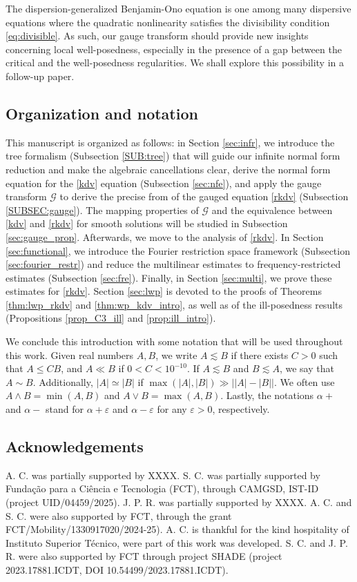 \documentclass[%
11pt,  reqno]{amsart}
\newcommand{\5}{\textup{V}}
\newcommand{\les}{\lesssim}
\newcommand{\eps}{\varepsilon}
\theoremstyle{remark}
\newcommand{\al}{\alpha}
\newcommand{\Gc}{\mathcal{G}}
\numberwithin{equation}{section}
\numberwithin{theorem}{section}
\begin{document}
\bigskip

The dispersion-generalized Benjamin-Ono equation is one among many dispersive equations where the quadratic nonlinearity satisfies the divisibility condition \eqref{eq:divisible}. As such, our gauge transform should provide new insights concerning local well-posedness, especially in the presence of a gap between the critical and the well-posedness regularities. We shall explore this possibility in a follow-up paper.

\subsection{Organization and notation} This manuscript is organized as follows: in Section \ref{sec:infr}, we introduce the tree formalism (Subsection \ref{SUB:tree}) that will guide our infinite normal form reduction and make the algebraic cancellations clear, derive the normal form equation for the \eqref{kdv} equation (Subsection \ref{sec:nfe}), and apply the gauge transform $\Gc$ to derive the precise from of the gauged equation \ref{rkdv} (Subsection \ref{SUBSEC:gauge}). The mapping properties of $\Gc$  and the equivalence between \eqref{kdv} and \eqref{rkdv} for smooth solutions will be studied in Subsection \ref{sec:gauge_prop}. Afterwards, we move to the analysis of \eqref{rkdv}. In Section \ref{sec:functional}, we introduce the Fourier restriction space framework (Subsection \ref{sec:fourier_restr}) and reduce the multilinear estimates to frequency-restricted estimates (Subsection \ref{sec:fre}). Finally, in Section \ref{sec:multi}, we prove these estimates for \eqref{rkdv}. Section \ref{sec:lwp} is devoted to the proofs of Theorems \ref{thm:lwp_rkdv} and \ref{thm:wp_kdv_intro}, as well as of the ill-posedness results (Propositions \ref{prop_C3_ill} and \ref{prop:ill_intro}).

\bigskip

We conclude this introduction with some notation that will be used throughout this work. Given real numbers $A,B$, we write $A \les B$ if there exists $C>0$ such that $A \le CB$, and $A \ll B$ if $0<C< 10^{-10}$. If $A\les B$ and $B\les A$, we say that $A\sim B$. Additionally, $|A| \simeq |B|$ if $\max(|A|,|B|) \gg \big| |A| - |B| \big|$. 
We often use $A \land B = \min(A,B)$ and $A \lor B = \max(A,B)$. 
Lastly, 
the notations $\al +$ and $\al-$ stand for $\al+\eps$ and $\al-\eps$ for any $\eps>0$, respectively. 

\subsection{Acknowledgements} A. C. was partially supported by XXXX. S. C. was partially supported by Funda\c{c}\~ao para a Ci\^encia e Tecnologia (FCT), through CAMGSD, IST-ID (project UID/04459/2025). J. P. R.  was partially supported by XXXX. A. C. and S. C. were also supported by FCT, through the grant FCT/Mobility/1330917020/2024-25). A. C. is thankful for the kind hospitality of Instituto Superior Técnico, were part of this work was developed. S. C. and J. P. R. were also supported by FCT through project SHADE (project 2023.17881.ICDT, DOI  10.54499/2023.17881.ICDT).
\end{document}
